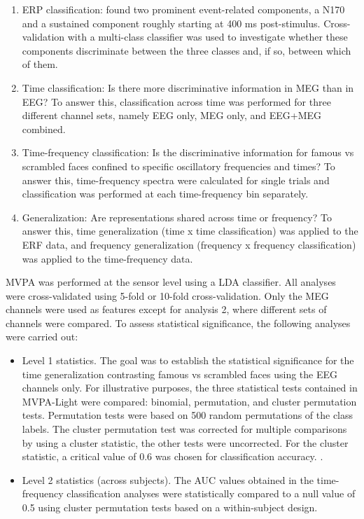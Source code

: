 \documentclass[utf8]{frontiersSCNS} %
\begin{document}
\begin{enumerate}
    \item ERP classification: \cite{Wakeman2015ADataset} found two prominent event-related components, a N170 and a sustained component roughly starting at 400 ms post-stimulus. Cross-validation with a multi-class classifier was used to investigate whether these components discriminate between the three classes and, if so, between which of them.
    \item Time classification: Is there more discriminative information in MEG than in EEG? To answer this, classification across time was performed for three different channel sets, namely EEG only, MEG only, and EEG+MEG combined.
    \item Time-frequency classification: Is the discriminative information for famous vs scrambled faces confined to specific oscillatory frequencies and times? To answer this, time-frequency spectra were calculated for single trials and classification was performed at each time-frequency bin separately.
    \item Generalization: Are representations shared across time \citep{King2014} or frequency? To answer this, time generalization (time x time classification) was applied to the ERF data, and frequency generalization (frequency x frequency classification) was applied to the time-frequency data.
\end{enumerate}

MVPA was performed at the sensor level using a LDA classifier. All analyses were cross-validated using 5-fold or 10-fold cross-validation. Only the MEG channels were used as features except for analysis 2, where different sets of channels were compared. To assess statistical significance, the following analyses were carried out:

\begin{itemize}
    \item Level 1 statistics. The goal was to establish the statistical significance for the time generalization contrasting famous vs scrambled faces using the EEG channels only. For illustrative purposes, the three statistical tests contained in MVPA-Light were compared: binomial, permutation, and cluster permutation tests. Permutation tests were based on 500 random permutations of the class labels. The cluster permutation test was corrected for multiple comparisons by using a cluster statistic, the other tests were uncorrected. For the cluster statistic, a critical value of 0.6 was chosen for classification accuracy. .
    \item Level 2 statistics (across subjects). The AUC values obtained in the time-frequency classification analyses were statistically compared to a null value of 0.5 using cluster permutation tests based on a within-subject design.

\end{itemize}
\end{document}

